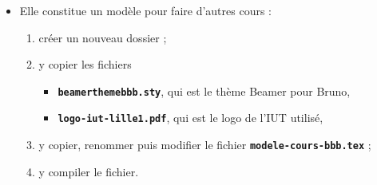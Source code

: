   \begin{itemize}
  \item Elle constitue un modèle pour faire d'autres cours :
      
    \begin{enumerate}
    \item créer un nouveau dossier ;
    \item y copier les fichiers 
      
      \begin{itemize}
      \item \texttt{\textbf{beamerthemebbb.sty}}, qui est le thème Beamer pour Bruno,
      \item \texttt{\textbf{logo-iut-lille1.pdf}}, qui est le logo de l'IUT utilisé,
      \end{itemize}
      
    \item y copier, renommer puis modifier le fichier \texttt{\textbf{modele-cours-bbb.tex}} ;
    \item y compiler le fichier.
    \end{enumerate}
  \end{itemize}
